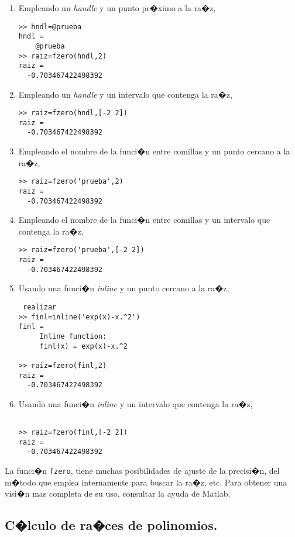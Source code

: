 \begin{enumerate}
\item Empleando un \emph{handle} y un punto pr�ximo a la ra�z,
\begin{verbatim}
>> hndl=@prueba
hndl = 
    @prueba
>> raiz=fzero(hndl,2)
raiz =
  -0.703467422498392
\end{verbatim}
\item Empleando un \emph{handle} y un intervalo que contenga la ra�z,
\begin{verbatim}
>> raiz=fzero(hndl,[-2 2])
raiz =
  -0.703467422498392
\end{verbatim}

\item Empleando el nombre de la funci�n entre comillas y un punto cercano a la ra�z,
\begin{verbatim}
>> raiz=fzero('prueba',2)
raiz =
  -0.703467422498392
\end{verbatim}

\item  Empleando el nombre de la funci�n entre comillas y un intervalo que contenga la ra�z,
\begin{verbatim}
>> raiz=fzero('prueba',[-2 2])
raiz =
  -0.703467422498392
\end{verbatim}

\item Usando una funci�n \emph{inline} y un punto cercano a la ra�z,
\begin{verbatim} realizar 
>> finl=inline('exp(x)-x.^2')
finl =
     Inline function:
     finl(x) = exp(x)-x.^2

>> raiz=fzero(finl,2)
raiz =
  -0.703467422498392
\end{verbatim}

\item Usando una funci�n \emph{inline} y un intervalo que contenga la ra�z, 
\begin{verbatim}

>> raiz=fzero(finl,[-2 2])
raiz =
  -0.703467422498392
\end{verbatim}
\end{enumerate} 

La funci�n \texttt{fzero}, tiene muchas posibilidades de ajuste de la precisi�n, del m�todo que emplea internamente para buscar la ra�z, etc. Para obtener una visi�n mas completa de su uso, consultar la ayuda de Matlab.

\subsection{C�lculo de ra�ces de polinomios.} 

